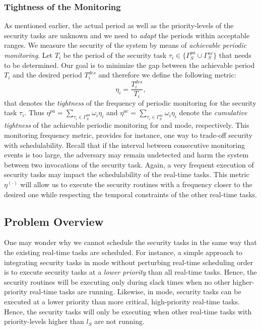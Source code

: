 \documentclass[../rt_server_main.tex]{subfiles}
\begin{document}
\subsubsection*{Tightness of the Monitoring}


As mentioned earlier, the actual period as well as the priority-levels of the security tasks  are unknown and we need to \textit{adapt} the periods within acceptable ranges. We measure the security of the system by means of  \textit{achievable periodic monitoring}. Let $T_i$ be the period of the security task $\tau_i \in \lbrace  \Gamma_S^{pa} \cup \Gamma_S^{ac} \rbrace$ that needs to be determined. Our goal is to minimize the gap between the achievable period $T_i$ and the desired period $T_i^{des}$ and therefore we define the following metric:
\begin{equation}
\eta_i = \frac{T_i^{des}}{T_i},
\end{equation}
that denotes the \textit{tightness} of the frequency of periodic monitoring for the security task $\tau_i$. Thus $\eta^{pa} =  \sum\limits_{\tau_i \in \Gamma_S^{pa}} \omega_i \eta_i$ and $\eta^{ac} =  \sum\limits_{\tau_i \in \Gamma_S^{ac}} \omega_i \eta_i$ denote the \textit{cumulative tightness} of the achievable periodic monitoring for \pve and \ave mode, respectively.
This monitoring frequency metric, provides for instance,  one way to trade-off security with schedulability. Recall that
if the interval between consecutive monitoring events is too large, the adversary may remain undetected and harm the system between two invocations of the security task. Again, a very frequent execution of security tasks may impact the schedulability of the real-time tasks. This metric $\eta^{(\cdot)}$ will allow us to execute the security routines with a frequency closer to the desired one while respecting the temporal constraints of the other real-time tasks.

\subsection{Problem Overview} \label{subsec:proble_overview}


One may wonder why we cannot schedule the security tasks in the same way that the existing real-time tasks are scheduled. For instance, a simple approach to integrating security tasks in \pve mode without perturbing real-time scheduling order is to execute security tasks at a \textit{lower priority} than all real-time tasks. Hence, the security routines will be executing only during slack times when no other higher-priority real-time tasks are running. Likewise, in \ave mode, security tasks can be executed at a lower priority than more critical, high-priority real-time tasks. 
Hence, the security tasks will only be executing when other real-time tasks with priority-levels higher than $l_S$ are not running. 
\end{document}
